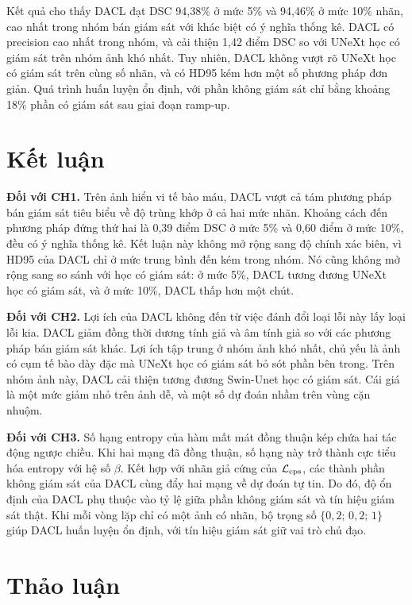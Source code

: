 Kết quả cho thấy DACL đạt DSC 94,38\% ở mức 5\% và 94,46\% ở mức 10\% nhãn, cao nhất trong nhóm bán giám sát với khác biệt có ý nghĩa thống kê. DACL có precision cao nhất trong nhóm, và cải thiện 1,42 điểm DSC so với UNeXt học có giám sát trên nhóm ảnh khó nhất. Tuy nhiên, DACL không vượt rõ UNeXt học có giám sát trên cùng số nhãn, và có HD95 kém hơn một số phương pháp đơn giản. Quá trình huấn luyện ổn định, với phần không giám sát chỉ bằng khoảng 18\% phần có giám sát sau giai đoạn ramp-up.

\section{Kết luận}
\label{sec:conclusion}

\textbf{Đối với CH1.} Trên ảnh hiển vi tế bào máu, DACL vượt cả tám phương pháp bán giám sát tiêu biểu về độ trùng khớp ở cả hai mức nhãn. Khoảng cách đến phương pháp đứng thứ hai là 0,39 điểm DSC ở mức 5\% và 0,60 điểm ở mức 10\%, đều có ý nghĩa thống kê. Kết luận này không mở rộng sang độ chính xác biên, vì HD95 của DACL chỉ ở mức trung bình đến kém trong nhóm. Nó cũng không mở rộng sang so sánh với học có giám sát: ở mức 5\%, DACL tương đương UNeXt học có giám sát, và ở mức 10\%, DACL thấp hơn một chút.

\textbf{Đối với CH2.} Lợi ích của DACL không đến từ việc đánh đổi loại lỗi này lấy loại lỗi kia. DACL giảm đồng thời dương tính giả và âm tính giả so với các phương pháp bán giám sát khác. Lợi ích tập trung ở nhóm ảnh khó nhất, chủ yếu là ảnh có cụm tế bào dày đặc mà UNeXt học có giám sát bỏ sót phần bên trong. Trên nhóm ảnh này, DACL cải thiện tương đương Swin-Unet học có giám sát. Cái giá là một mức giảm nhỏ trên ảnh dễ, và một số dự đoán nhầm trên vùng cặn nhuộm.

\textbf{Đối với CH3.} Số hạng entropy của hàm mất mát đồng thuận kép chứa hai tác động ngược chiều. Khi hai mạng đã đồng thuận, số hạng này trở thành cực tiểu hóa entropy với hệ số $\beta$. Kết hợp với nhãn giả cứng của $\mathcal{L}_{\mathrm{cps}}$, các thành phần không giám sát của DACL cùng đẩy hai mạng về dự đoán tự tin. Do đó, độ ổn định của DACL phụ thuộc vào tỷ lệ giữa phần không giám sát và tín hiệu giám sát thật. Khi mỗi vòng lặp chỉ có một ảnh có nhãn, bộ trọng số $\{0{,}2;\,0{,}2;\,1\}$ giúp DACL huấn luyện ổn định, với tín hiệu giám sát giữ vai trò chủ đạo.

\section{Thảo luận}
\label{sec:discussion}

